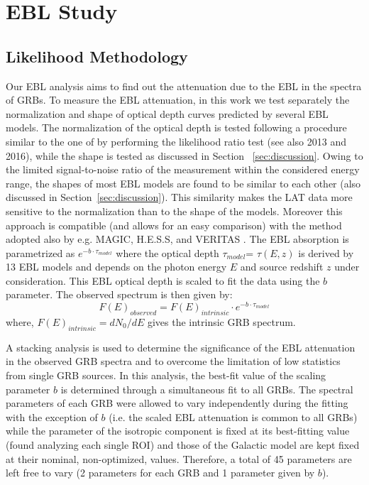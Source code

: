 \documentclass[12pt,preprint]{aastex}
\begin{document}
\section{EBL Study}
\label{sec:eblanalysis}
\subsection{Likelihood Methodology}
\label{ssec:method}


Our EBL analysis aims to find out the attenuation due to the EBL in the spectra of GRBs.
{ To measure the EBL attenuation, in this work we test separately the normalization and shape of optical depth curves predicted by several EBL models. The normalization of the optical depth is tested following a procedure similar to the one of \cite{ebl12} by performing the likelihood ratio test (see also \citeauthor{hess_ebl12} 2013 and \citeauthor{magic16} 2016), while the shape is tested as discussed in Section ~\ref{sec:discussion}. Owing to the limited signal-to-noise ratio of the measurement within the considered energy range, the shapes of most EBL models are found to be similar to each other (also discussed in Section~\ref{sec:discussion}). This similarity makes the LAT data more sensitive to the normalization than to the shape of the models. Moreover this approach is compatible (and allows for an easy comparison) with the method adopted also by e.g. MAGIC, H.E.S.S, and VERITAS \citep{magicebl,hess_ebl12,veritasebl}.}
The EBL
absorption is parametrized as $e^{-b \cdot \tau_{model} }$ where the optical
depth $\tau_{model}$= $\tau(E,z)$ 
is derived by 13 EBL models \cite[see Table~\ref{tab:grbresults} e.g.][]{kneiske04,finke10,dominguez11,
stecker12,helgason12} and depends on the photon energy $E$ and source
redshift $z$ { under} consideration.
This EBL optical depth is scaled to fit the data using the $b$
parameter. The observed spectrum is then given by:
\begin{equation}
    F(E)_{observed} = F(E)_{intrinsic} \cdot e^{-b \cdot \tau_{model} }
\end{equation}
where, {$F(E)_{intrinsic}={{dN_0}/{dE}}$} gives the intrinsic GRB spectrum.

 {A stacking analysis is used to determine the significance of the EBL
attenuation in the observed
GRB spectra and to overcome the limitation of low statistics from single GRB sources.}
In this analysis, the best-fit value of the scaling parameter $b$ is
determined through a simultaneous fit to all GRBs. 
The spectral parameters of each GRB were allowed to vary independently during
the fitting with the exception of $b$ (i.e. the scaled
EBL attenuation is common to all GRBs) {while the parameter of
    the isotropic component is fixed at its best-fitting value (found
    analyzing each single ROI) and
    those of the Galactic model are kept fixed at their nominal, non-optimized, values.}
Therefore, a total of 45 parameters are left free to vary 
(2 parameters for each GRB and 1 parameter given by $b$).
\end{document}
